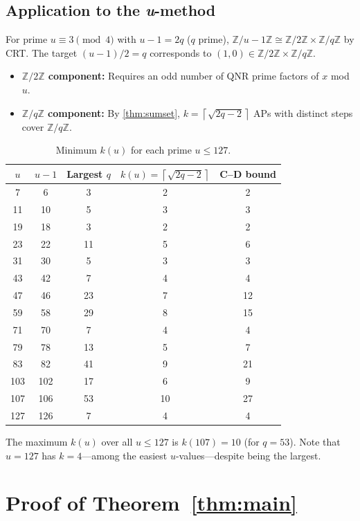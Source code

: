 \documentclass[11pt,a4paper]{article}
\theoremstyle{plain}
\theoremstyle{definition}
\newcommand{\Z}{\mathbb{Z}}
\newcommand{\Zp}[1]{\Z/#1\Z}
\newcommand{\ceil}[1]{\left\lceil #1 \right\rceil}
\begin{document}
\subsection{Application to the \emph{u}-method}

For prime $u \equiv 3 \pmod{4}$ with $u - 1 = 2q$ ($q$ prime), $\Zp{u-1} \cong \Zp{2} \times \Zp{q}$ by CRT. The target $(u-1)/2 = q$ corresponds to $(1, 0) \in \Zp{2} \times \Zp{q}$.

\begin{itemize}
\item \textbf{$\Zp{2}$ component:} Requires an odd number of QNR prime factors of $x$ mod $u$.
\item \textbf{$\Zp{q}$ component:} By \cref{thm:sumset}, $k = \ceil{\sqrt{2q-2}}$ APs with distinct steps cover $\Zp{q}$.
\end{itemize}

\begin{table}[h]
\centering
\caption{Minimum $k(u)$ for each prime $u \leq 127$.}
\label{tab:ku}
\begin{tabular}{ccccc}
\toprule
$u$ & $u - 1$ & Largest $q$ & $k(u) = \ceil{\sqrt{2q-2}}$ & C--D bound \\
\midrule
7 & 6 & 3 & 2 & 2 \\
11 & 10 & 5 & 3 & 3 \\
19 & 18 & 3 & 2 & 2 \\
23 & 22 & 11 & 5 & 6 \\
31 & 30 & 5 & 3 & 3 \\
43 & 42 & 7 & 4 & 4 \\
47 & 46 & 23 & 7 & 12 \\
59 & 58 & 29 & 8 & 15 \\
71 & 70 & 7 & 4 & 4 \\
79 & 78 & 13 & 5 & 7 \\
83 & 82 & 41 & 9 & 21 \\
103 & 102 & 17 & 6 & 9 \\
107 & 106 & 53 & 10 & 27 \\
127 & 126 & 7 & 4 & 4 \\
\bottomrule
\end{tabular}
\end{table}

The maximum $k(u)$ over all $u \leq 127$ is $k(107) = 10$ (for $q = 53$). Note that $u = 127$ has $k = 4$---among the easiest $u$-values---despite being the largest.

\section{Proof of Theorem~\ref{thm:main}}
\end{document}

